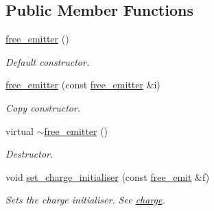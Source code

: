 \subsection*{Public Member Functions}
\begin{DoxyCompactItemize}
\item 
\mbox{\label{classphysim_1_1emitters_1_1free__emitter_a510e60d9de5438fc91494b5018329bc1}} 
\hyperlink{classphysim_1_1emitters_1_1free__emitter_a510e60d9de5438fc91494b5018329bc1}{free\+\_\+emitter} ()
\begin{DoxyCompactList}\small\item\em Default constructor. \end{DoxyCompactList}\item 
\mbox{\label{classphysim_1_1emitters_1_1free__emitter_a2a9ae9952f735c67c0138c3385bf59a4}} 
\hyperlink{classphysim_1_1emitters_1_1free__emitter_a2a9ae9952f735c67c0138c3385bf59a4}{free\+\_\+emitter} (const \hyperlink{classphysim_1_1emitters_1_1free__emitter}{free\+\_\+emitter} \&i)
\begin{DoxyCompactList}\small\item\em Copy constructor. \end{DoxyCompactList}\item 
\mbox{\label{classphysim_1_1emitters_1_1free__emitter_ae9777b2e847f64d0e3a88a6b96979c9d}} 
virtual \hyperlink{classphysim_1_1emitters_1_1free__emitter_ae9777b2e847f64d0e3a88a6b96979c9d}{$\sim$free\+\_\+emitter} ()
\begin{DoxyCompactList}\small\item\em Destructor. \end{DoxyCompactList}\item 
\mbox{\label{classphysim_1_1emitters_1_1free__emitter_a72d9b7819fceb26e5b0d087977ed17b4}} 
void \hyperlink{classphysim_1_1emitters_1_1free__emitter_a72d9b7819fceb26e5b0d087977ed17b4}{set\+\_\+charge\+\_\+initialiser} (const \hyperlink{namespacephysim_1_1emitters_a68725a630c2e0c1b4cdff4ca0ee174ac}{free\+\_\+emit} \&f)
\begin{DoxyCompactList}\small\item\em Sets the charge initialiser. See \hyperlink{classphysim_1_1emitters_1_1free__emitter_a895244d2023c4cc72658d356bdb51b9a}{charge}. \end{DoxyCompactList}\item 

\end{DoxyCompactItemize}
